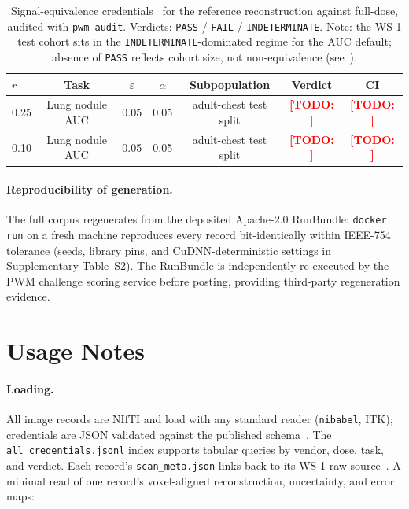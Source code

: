 \documentclass{article}
\newcommand{\todo}[1]{\textcolor{red}{\textbf{[TODO: #1]}}}
\begin{document}
\begin{table}[h]
    \centering
    \footnotesize
    \begin{tabular}{lcccccc}
        \toprule
        $r$ & Task & $\varepsilon$ & $\alpha$ & Subpopulation & Verdict & CI \\
        \midrule
        0.25 & Lung nodule AUC   & 0.05 & 0.05 & adult-chest test split   & \todo{} & \todo{} \\
        0.10 & Lung nodule AUC   & 0.05 & 0.05 & adult-chest test split   & \todo{} & \todo{} \\
        \bottomrule
    \end{tabular}
    \caption{Signal-equivalence credentials~\citep{ws2framework} for the
    reference reconstruction against full-dose, audited with
    \texttt{pwm-audit}. Verdicts: \texttt{PASS} / \texttt{FAIL} /
    \texttt{INDETERMINATE}. Note: the WS-1 test cohort sits in the
    \texttt{INDETERMINATE}-dominated regime for the AUC default; absence
    of \texttt{PASS} reflects cohort size, not non-equivalence
    (see~\citealp{ws2framework}).}
    \label{tab:credentials}
\end{table}

\paragraph{Reproducibility of generation.} The full corpus regenerates
from the deposited Apache-2.0 RunBundle: \texttt{docker run} on a fresh
machine reproduces every record bit-identically within IEEE-754 tolerance
(seeds, library pins, and CuDNN-deterministic settings in Supplementary
Table~S2). The RunBundle is independently re-executed by the PWM
challenge scoring service before posting, providing third-party
regeneration evidence.

\section{Usage Notes}
\label{sec:usage}

\paragraph{Loading.} All image records are NIfTI and load with any
standard reader (\texttt{nibabel}, ITK); credentials are JSON validated
against the published schema~\citep{ws2framework}. The
\texttt{all\_credentials.jsonl} index supports tabular queries by vendor,
dose, task, and verdict. Each record's \texttt{scan\_meta.json} links back
to its WS-1 raw source~\citep{ws1dataset}. A minimal read of one record's
voxel-aligned reconstruction, uncertainty, and error maps:
\end{document}
